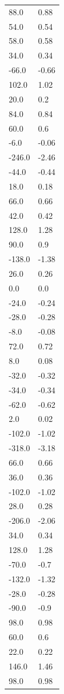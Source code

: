 \begin{longtable}{ll}
88.0 & 0.88 \\
54.0 & 0.54 \\
58.0 & 0.58 \\
34.0 & 0.34 \\
-66.0 & -0.66 \\
102.0 & 1.02 \\
20.0 & 0.2 \\
84.0 & 0.84 \\
60.0 & 0.6 \\
-6.0 & -0.06 \\
-246.0 & -2.46 \\
-44.0 & -0.44 \\
18.0 & 0.18 \\
66.0 & 0.66 \\
42.0 & 0.42 \\
128.0 & 1.28 \\
90.0 & 0.9 \\
-138.0 & -1.38 \\
26.0 & 0.26 \\
0.0 & 0.0 \\
-24.0 & -0.24 \\
-28.0 & -0.28 \\
-8.0 & -0.08 \\
72.0 & 0.72 \\
8.0 & 0.08 \\
-32.0 & -0.32 \\
-34.0 & -0.34 \\
-62.0 & -0.62 \\
2.0 & 0.02 \\
-102.0 & -1.02 \\
-318.0 & -3.18 \\
66.0 & 0.66 \\
36.0 & 0.36 \\
-102.0 & -1.02 \\
28.0 & 0.28 \\
-206.0 & -2.06 \\
34.0 & 0.34 \\
128.0 & 1.28 \\
-70.0 & -0.7 \\
-132.0 & -1.32 \\
-28.0 & -0.28 \\
-90.0 & -0.9 \\
98.0 & 0.98 \\
60.0 & 0.6 \\
22.0 & 0.22 \\
146.0 & 1.46 \\
98.0 & 0.98 \\

\end{longtable}
